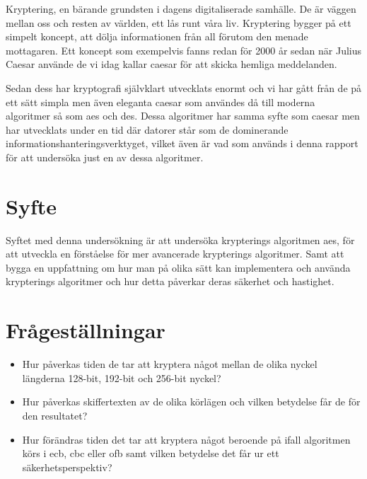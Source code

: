Kryptering, en bärande grundsten i dagens digitaliserade samhälle. De är väggen mellan oss och resten
av världen, ett lås runt våra liv. Kryptering bygger på ett simpelt koncept, att dölja informationen
från all förutom den menade mottagaren. Ett koncept som exempelvis fanns redan för 2000 år sedan när Julius
Caesar använde de vi idag kallar \gls{caesar} för att skicka hemliga meddelanden.

Sedan dess har kryptografi självklart utvecklats enormt och vi har gått från de på ett sätt simpla men
även eleganta \gls{caesar} som användes då till moderna algoritmer så som \acrlong{aes} och \acrlong{des}.
Dessa algoritmer har samma syfte som \gls{caesar} men har utvecklats under en tid där datorer står som
de dominerande informationshanteringsverktyget, vilket även är vad som används i denna rapport för att
undersöka just en av dessa algoritmer.

\section{Syfte} %
Syftet med denna undersökning är att undersöka krypterings algoritmen \acrshort{aes},
för att utveckla en förståelse för mer avancerade krypterings algoritmer.
Samt att bygga en uppfattning om hur man på olika sätt kan implementera och använda
krypterings algoritmer och hur detta påverkar deras säkerhet och hastighet.

\section{Frågeställningar} %
\begin{itemize}
    \setlength{\itemindent}{-1em}
    \item Hur påverkas tiden de tar att kryptera något mellan de olika nyckel längderna 128-bit,
          192-bit och 256-bit nyckel?

    \item Hur påverkas skiffertexten av de olika körlägen och vilken betydelse får de för den resultatet?

    \item Hur förändras tiden det tar att kryptera något beroende på ifall algoritmen körs i
          \acrshort{ecb}, \acrshort{cbc} eller \acrshort{ofb} samt vilken betydelse det får ur ett
          säkerhetsperspektiv?
\end{itemize}

